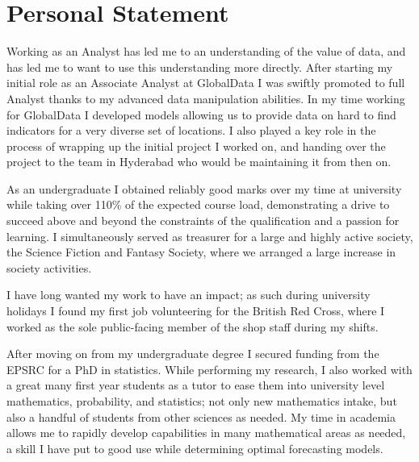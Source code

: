 \documentclass[print, oneside]{friggeri-cv} %
\begin{document}
\section{Personal Statement}
\begin{entrylist}
\entry{}{}{}
{

\quad Working as an Analyst has led me to an understanding of the value of data, and has led me to want to use this understanding more directly.
After starting my initial role as an Associate Analyst at GlobalData I was swiftly promoted to full Analyst thanks to my advanced data manipulation abilities.
In my time working for GlobalData I developed models allowing us to provide data on hard to find indicators for a very diverse set of locations.
I also played a key role in the process of wrapping up the initial project I worked on, and handing over the project to the team in Hyderabad who would be maintaining it from then on.

\quad As an undergraduate I obtained reliably good marks over my time at university while taking over 110\% of the expected course load, demonstrating a drive to succeed above and beyond the constraints of the qualification and a passion for learning.
I simultaneously served as treasurer for a large and highly active society, the Science Fiction and Fantasy Society, where we arranged a large increase in society activities.

\quad I have long wanted my work to have an impact; as such during university holidays I found  my first job volunteering for the British Red Cross, where I worked as the sole public-facing member of the shop staff during my shifts.

\quad After moving on from my undergraduate degree I secured funding from the EPSRC for a PhD in statistics.
While performing my research, I also worked with a great many first year students as a tutor to ease them into university level mathematics, probability, and statistics; not only new mathematics intake, but also a handful of students from other sciences as needed.
My time in academia allows me to rapidly develop capabilities in many mathematical areas as needed, a skill I have put to good use while determining optimal forecasting models.

}
\end{entrylist}
\end{document}
